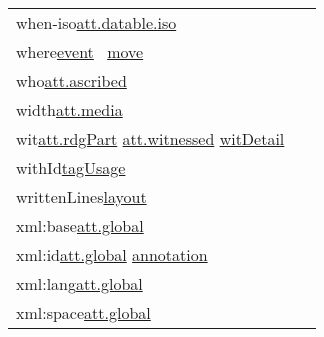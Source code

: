 \begin{longtable}{L{.2\textwidth}P{.8\textwidth}}
when-iso\tabcellsep \hyperref[TEI.att.datable.iso]{att.datable.iso}\\
where\tabcellsep \hyperref[TEI.event]{event}  \hyperref[TEI.move]{move} \\
who\tabcellsep \hyperref[TEI.att.ascribed]{att.ascribed}\\
width\tabcellsep \hyperref[TEI.att.media]{att.media}\\
wit\tabcellsep \hyperref[TEI.att.rdgPart]{att.rdgPart} \hyperref[TEI.att.witnessed]{att.witnessed} \hyperref[TEI.witDetail]{witDetail} \\
withId\tabcellsep \hyperref[TEI.tagUsage]{tagUsage} \\
writtenLines\tabcellsep \hyperref[TEI.layout]{layout} \\
xml:base\tabcellsep \hyperref[TEI.att.global]{att.global}\\
xml:id\tabcellsep \hyperref[TEI.att.global]{att.global} \hyperref[TEI.annotation]{annotation} \\
xml:lang\tabcellsep \hyperref[TEI.att.global]{att.global}\\
xml:space\tabcellsep \hyperref[TEI.att.global]{att.global}\end{longtable} \par
 